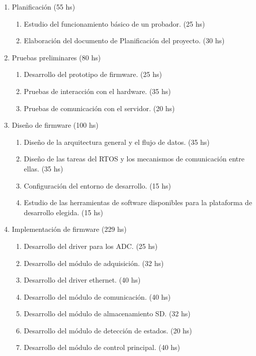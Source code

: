 \documentclass[11pt]{charter}
\begin{document}
\begin{enumerate}
\item Planificación \hfill (55 hs)
	\begin{enumerate}
	\item Estudio del funcionamiento básico de un probador. \hfill (25 hs)
	\item Elaboración del documento de Planificación del proyecto. \hfill (30 hs)
	\end{enumerate}
\item Pruebas preliminares \hfill (80 hs)
	\begin{enumerate}
	\item Desarrollo del prototipo de firmware. \hfill (25 hs)
	\item Pruebas de interacción con el hardware. \hfill (35 hs)
	\item Pruebas de comunicación con el servidor. \hfill (20 hs)
	\end{enumerate}
\item Diseño de firmware \hfill (100 hs)
	\begin{enumerate}
	\item Diseño de la arquitectura general y el flujo de datos. \hfill (35 hs)
	\item Diseño de las tareas del RTOS y los mecanismos \newline de comunicación entre ellas.  \hfill (35 hs)
	\item Configuración del entorno de desarrollo. \hfill (15 hs)
	\item Estudio de las herramientas de software disponibles para la plataforma \newline de desarrollo elegida. \hfill (15 hs)
	\end{enumerate}
\item Implementación de firmware \hfill (229 hs)
	\begin{enumerate}
	\item Desarrollo del driver para los ADC. \hfill (25 hs)
	\item Desarrollo del módulo de adquisición. \hfill (32 hs)
	\item Desarrollo del driver ethernet. \hfill (40 hs)
	\item Desarrollo del módulo de comunicación. \hfill (40 hs)
	\item Desarrollo del módulo de almacenamiento SD.  \hfill (32 hs)
	\item Desarrollo del módulo de detección de estados. \hfill (20 hs)
	\item Desarrollo del módulo de control principal. \hfill (40 hs)

\end{enumerate}
\end{enumerate}
\end{document}

